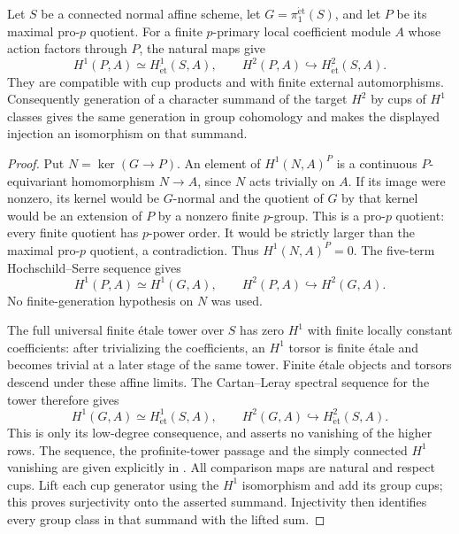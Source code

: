 \begin{lemma}\label{lem:etale-prop}
Let $S$ be a connected normal affine scheme, let
$G=\pi_1^{\mathrm{\acute et}}(S)$, and let $P$ be its maximal
pro-$p$ quotient. For a finite $p$-primary local coefficient module
$A$ whose action factors through $P$, the natural maps give
\[
 H^1(P,A)\simeq H^1_{\mathrm{\acute et}}(S,A),\qquad
 H^2(P,A)\hookrightarrow H^2_{\mathrm{\acute et}}(S,A).
\]
They are compatible with cup products and with finite external
automorphisms. Consequently generation of a character summand of
the target $H^2$ by cups of $H^1$ classes gives the same generation
in group cohomology and makes the displayed injection an
isomorphism on that summand.
\end{lemma}

\begin{proof}
Put $N=\ker(G\to P)$. An element of $H^1(N,A)^P$ is a continuous
$P$-equivariant homomorphism $N\to A$, since $N$ acts trivially
on $A$. If its image were nonzero, its kernel would be $G$-normal
and the quotient of $G$ by that kernel would be an extension of
$P$ by a nonzero finite $p$-group. This is a pro-$p$ quotient:
every finite quotient has $p$-power order. It would be strictly
larger than the maximal pro-$p$ quotient, a contradiction.
Thus $H^1(N,A)^P=0$. The five-term Hochschild--Serre sequence gives
\[
 H^1(P,A)\simeq H^1(G,A),\qquad
 H^2(P,A)\hookrightarrow H^2(G,A).
\]
No finite-generation hypothesis on $N$ was used.

The full universal finite \'etale tower over $S$ has zero $H^1$
with finite locally constant coefficients: after trivializing the
coefficients, an $H^1$ torsor is finite \'etale and becomes trivial
at a later stage of the same tower. Finite \'etale objects and
torsors descend under these affine limits. The Cartan--Leray
spectral sequence for the tower therefore gives
\[
 H^1(G,A)\simeq H^1_{\mathrm{\acute et}}(S,A),\qquad
 H^2(G,A)\hookrightarrow H^2_{\mathrm{\acute et}}(S,A).
\]
This is only its low-degree consequence, and asserts no vanishing
of the higher rows. The sequence, the profinite-tower passage and
the simply connected $H^1$ vanishing are given explicitly in
\cite[Theorem~14.9, Remark~14.10, Example~14.11 and
Proposition~14.13, pp.~96--98]{MilneLEC2013}.
All comparison maps are natural and respect cups.
Lift each cup generator using the $H^1$ isomorphism and add its
group cups; this proves surjectivity onto the asserted summand.
Injectivity then identifies every group class in that summand with
the lifted sum.
\end{proof}

